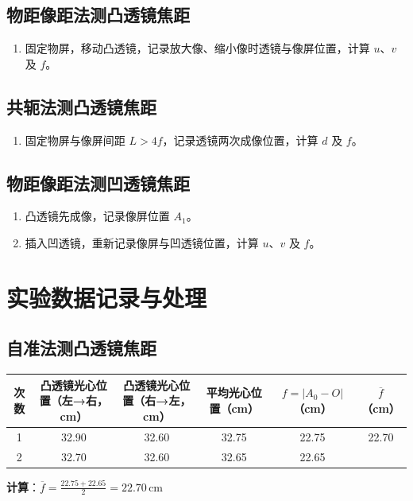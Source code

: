 \documentclass[12pt,a4paper]{article}
\begin{document}
\subsection{物距像距法测凸透镜焦距}
\begin{enumerate}
\item 固定物屏，移动凸透镜，记录放大像、缩小像时透镜与像屏位置，计算 $u$、$v$ 及 $f$。
\end{enumerate}

\subsection{共轭法测凸透镜焦距}
\begin{enumerate}
\item 固定物屏与像屏间距 $L > 4f$，记录透镜两次成像位置，计算 $d$ 及 $f$。
\end{enumerate}

\subsection{物距像距法测凹透镜焦距}
\begin{enumerate}
\item 凸透镜先成像，记录像屏位置 $A_1$。
\item 插入凹透镜，重新记录像屏与凹透镜位置，计算 $u$、$v$ 及 $f$。
\end{enumerate}

\section{实验数据记录与处理}

\subsection{自准法测凸透镜焦距}

\begin{table}[H]
\centering
\begin{tabular}{|c|c|c|c|c|c|}
\hline
次数 & 凸透镜光心位置（左→右，cm） & 凸透镜光心位置（右→左，cm） & 平均光心位置（cm） & $f = |A_0 - O|$（cm） & $\overline{f}$（cm） \\
\hline
1 & 32.90 & 32.60 & 32.75 & 22.75 & 22.70 \\
\hline
2 & 32.70 & 32.60 & 32.65 & 22.65 & \\
\hline
\end{tabular}
\end{table}

\textbf{计算}：$\overline{f} = \frac{22.75 + 22.65}{2} = 22.70 \, \text{cm}$
\end{document}
